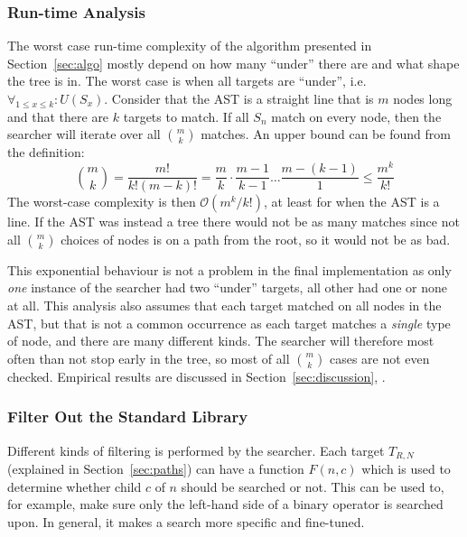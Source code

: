 \documentclass[a4paper,12pt]{article}
\newcommand{\Oh}[1]{\mathcal{O} (#1)}
\begin{document}
\subsubsection{Run-time Analysis}\label{sec:algo:anal}
The worst case run-time complexity of the algorithm presented in Section~\ref{sec:algo}
mostly depend on how many ``under'' there are and what shape the
tree is in. The worst case is when all targets are ``under'', i.e.\@ $\forall_{1 \leq x
  \leq k} : U(S_x)$. Consider that the AST is a straight line that is $m$
nodes long and that there are $k$ targets to match. If all $S_n$ match on every node, then the
searcher will iterate over all $\binom{m}{k}$ matches. An upper bound can be found from the
definition:
\begin{equation*}
  \binom{m}{k} = \frac{m!}{k! (m-k)!} = \frac{m}{k} \cdot \frac{m-1}{k-1} \dots \frac{m -
    (k-1)}{1} \leq \frac{m^k}{k!}
\end{equation*}%
The worst-case complexity is then $\Oh{{m^k}/{k!}}$, at least for when the AST is a line.
If the AST was instead a tree there would not be as many matches since not all
$\binom{m}{k}$ choices of nodes is on a path from the root, so it would not be as bad.

This exponential behaviour is not a problem in the final implementation as only \emph{one}
instance of the searcher had two ``under'' targets, all other had one or none at all.
This analysis also assumes that each target matched
on all nodes in the AST, but that is not a common occurrence as each target matches a
\emph{single} type of node, and there are many different kinds. The searcher will
therefore most often than not stop early in the tree, so most of all $\binom{m}{k}$ cases
are not even checked. Empirical results are discussed in Section~\ref{sec:discussion},
.

\subsubsection{Filter Out the Standard Library}\label{sec:filter:stdlib}
Different kinds of filtering is performed by the searcher. Each target $T_{R,N}$
(explained in Section~\ref{sec:paths}) can have a function $F(n,c)$ which is used to
determine whether child $c$ of $n$ should be searched or not. This can be used to, for
example, make sure only the left-hand side of a binary operator is searched upon. In
general, it makes a search more specific and fine-tuned.
\end{document}
